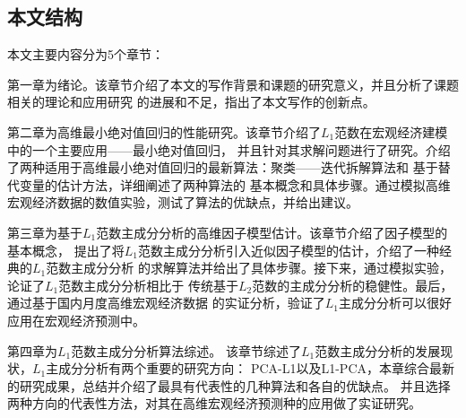 \subsection{本文结构}

本文主要内容分为5个章节：

第一章为绪论。该章节介绍了本文的写作背景和课题的研究意义，并且分析了课题相关的理论和应用研究
的进展和不足，指出了本文写作的创新点。

第二章为高维最小绝对值回归的性能研究。该章节介绍了$L_1$范数在宏观经济建模中的一个主要应用——最小绝对值回归，
并且针对其求解问题进行了研究。介绍了两种适用于高维最小绝对值回归的最新算法：聚类——迭代拆解算法和
基于替代变量的估计方法，详细阐述了两种算法的
基本概念和具体步骤。通过模拟高维宏观经济数据的数值实验，测试了算法的优缺点，并给出建议。

第三章为基于$L_1$范数主成分分析的高维因子模型估计。该章节介绍了因子模型的基本概念，
提出了将$L_1$范数主成分分析引入近似因子模型的估计，介绍了一种经典的$L_1$范数主成分分析
的求解算法并给出了具体步骤。接下来，通过模拟实验，论证了$L_1$范数主成分分析相比于
传统基于$L_2$范数的主成分分析的稳健性。最后，通过基于国内月度高维宏观经济数据
的实证分析，验证了$L_1$主成分分析可以很好应用在宏观经济预测中。

第四章为$L_1$范数主成分分析算法综述。
该章节综述了$L_1$范数主成分分析的发展现状，$L_1$主成分分析有两个重要的研究方向：
PCA-L1以及L1-PCA，本章综合最新的研究成果，总结并介绍了最具有代表性的几种算法和各自的优缺点。
并且选择两种方向的代表性方法，对其在高维宏观经济预测种的应用做了实证研究。
